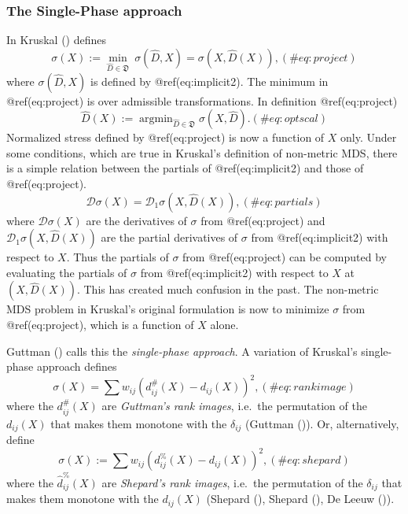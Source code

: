 \documentclass[
  12pt,
  letterpaper,
  DIV=11,
  numbers=noendperiod]{scrartcl}
\theoremstyle{plain}
\theoremstyle{remark}
\begin{document}
\subsubsection{The Single-Phase
approach}\label{the-single-phase-approach}

In Kruskal () defines \begin{equation}
\sigma(X):=\min_{\hat D\in\mathfrak{D}}\ \sigma(\hat D,X)=\sigma(X,\hat D(X)),
(\#eq:project)
\end{equation} where \(\sigma(\hat D,X)\) is defined by
@ref(eq:implicit2). The minimum in @ref(eq:project) is over admissible
transformations. In definition @ref(eq:project) \begin{equation}
\hat D(X):=\mathop{\text{argmin}}_{\hat D\in\mathfrak{D}}\sigma(X, \hat D).
(\#eq:optscal)
\end{equation} Normalized stress defined by @ref(eq:project) is now a
function of \(X\) only. Under some conditions, which are true in
Kruskal's definition of non-metric MDS, there is a simple relation
between the partials of @ref(eq:implicit2) and those of
@ref(eq:project). \begin{equation}
\mathcal{D}\sigma(X)=\mathcal{D}_1\sigma(X,\hat D(X)),
(\#eq:partials)
\end{equation} where \(\mathcal{D}\sigma(X)\) are the derivatives of
\(\sigma\) from @ref(eq:project) and
\(\mathcal{D}_1\sigma(X,\hat D(X))\) are the partial derivatives of
\(\sigma\) from @ref(eq:implicit2) with respect to \(X\). Thus the
partials of \(\sigma\) from @ref(eq:project) can be computed by
evaluating the partials of \(\sigma\) from @ref(eq:implicit2) with
respect to \(X\) at \((X,\hat D(X))\). This has created much confusion
in the past. The non-metric MDS problem in Kruskal's original
formulation is now to minimize \(\sigma\) from @ref(eq:project), which
is a function of \(X\) alone.

Guttman () calls this the
\emph{single-phase approach}. A variation of Kruskal's single-phase
approach defines \begin{equation}
\sigma(X)=\sum w_{ij}(d_{ij}^\#(X)-d_{ij}(X))^2,
(\#eq:rankimage)
\end{equation} where the \(d_{ij}^\#(X)\) are \emph{Guttman's rank
images}, i.e.~the permutation of the \(d_{ij}(X)\) that makes them
monotone with the \(\delta_{ij}\) (Guttman
()). Or, alternatively, define
\begin{equation}
\sigma(X):=\sum   w_{ij}(d_{ij}^\%(X)-d_{ij}(X))^2,
(\#eq:shepard)
\end{equation} where the \(\hat d_{ij}^\%(X)\) are \emph{Shepard's rank
images}, i.e.~the permutation of the \(\delta_{ij}\) that makes them
monotone with the \(d_{ij}(X)\) (Shepard
(), Shepard
(), De Leeuw
()).
\end{document}
